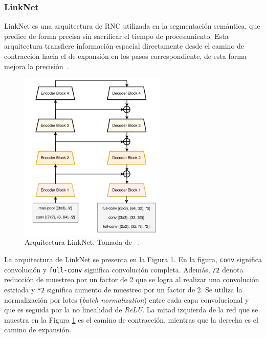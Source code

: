 \subsubsection{LinkNet}

LinkNet es una arquitectura de RNC utilizada en la segmentación semántica, que predice de forma precisa sin sacrificar el tiempo de procesamiento. Esta arquitectura transfiere información espacial directamente desde el camino de contracción hacia el de expansión en los pasos correspondiente, de esta forma mejora la precisión~\cite{chaurasia2017linknet}.

\begin{figure}[ht]
	\centering
	\includegraphics[width=7cm]{./Graphics/linknet.png}
	\caption{Arquitectura LinkNet. Tomada de ~\cite{chaurasia2017linknet}.}
	\label{fig:linknet}
\end{figure}

La arquitectura de LinkNet se presenta en la Figura \ref{fig:linknet}. En la figura, \verb|conv| significa convolución y \verb|full-conv| significa convolución completa. Además, \verb|/2| denota reducción de muestreo por un factor de 2 que se logra al realizar una convolución estriada y \verb|*2| significa aumento de muestreo por un factor de 2. Se utiliza la normalización por lotes (\textit{batch normalization}) entre cada capa convolucional y que es seguida por la no linealidad de \textit{ReLU}. La mitad izquierda de la red que se muestra en la Figura \ref{fig:linknet} es el camino de contracción, mientras que la derecha es el camino de expansión.

